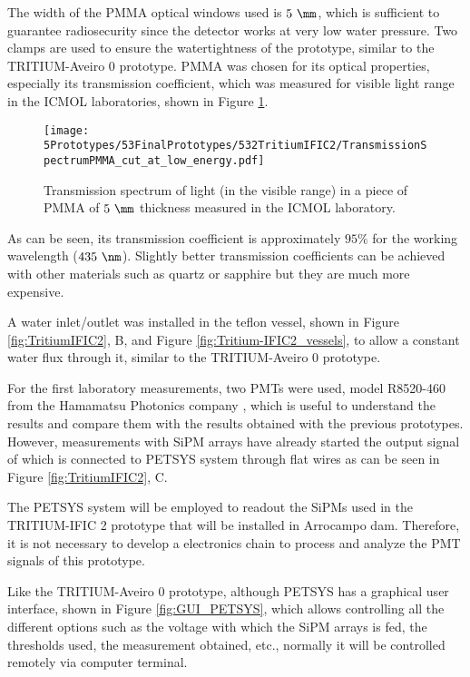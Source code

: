 The width of the PMMA optical windows used is $5~\mm$, which is sufficient to guarantee radiosecurity since the detector works at very low water pressure. Two clamps are used to ensure the watertightness of the prototype, similar to the TRITIUM-Aveiro 0 prototype. PMMA was chosen for its optical properties, especially its transmission coefficient, which was measured for visible light range in the ICMOL laboratories, shown in Figure \ref{fig:PMMATransmissionSpectrum}.

\begin{figure}[h]
\centering
\texttt{[image: 5Prototypes/53FinalPrototypes/532TritiumIFIC2/TransmissionSpectrumPMMA\_cut\_at\_low\_energy.pdf]}
\caption{Transmission spectrum of light (in the visible range) in a piece of PMMA of $5~\mm$ thickness measured in the ICMOL laboratory. \label{fig:PMMATransmissionSpectrum}}
\end{figure}	

As can be seen, its transmission coefficient is approximately $95\%$ for the working wavelength ($435~\nm$). Slightly better transmission coefficients can be achieved with other materials such as quartz or sapphire but they are much more expensive.

A water inlet/outlet was installed in the teflon vessel, shown in Figure \ref{fig:TritiumIFIC2}, B, and Figure \ref{fig:Tritium-IFIC2_vessels}, to allow a constant water flux through it, similar to the TRITIUM-Aveiro 0 prototype.

For the first laboratory measurements, two PMTs were used, model R8520-460 from the Hamamatsu Photonics company \cite{DataSheetPMTs}, which is useful to understand the results and compare them with the results obtained with the previous prototypes. However, measurements with SiPM arrays have already started the output signal of which is connected to PETSYS system through flat wires as can be seen in Figure \ref{fig:TritiumIFIC2}, C.

The PETSYS system will be employed to readout the SiPMs used in the TRITIUM-IFIC 2 prototype that will be installed in Arrocampo dam. Therefore, it is not necessary to develop a electronics chain to process and analyze the PMT signals of this prototype.

Like the TRITIUM-Aveiro 0 prototype, although PETSYS has a graphical user interface, shown in Figure \ref{fig:GUI_PETSYS}, which allows controlling all the different options such as the voltage with which the SiPM arrays is fed, the thresholds used, the measurement obtained, etc., normally it will be controlled remotely via computer terminal. 

